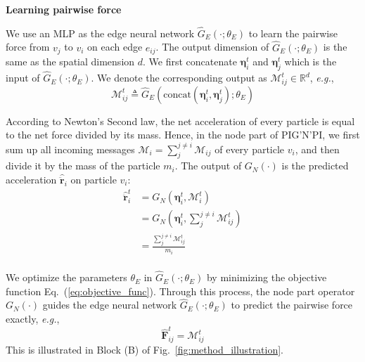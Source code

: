 \documentclass{article}
\newcommand{\pignpi}{PIG'N'PI\xspace}
\begin{document}
\textbf{Learning pairwise force}

We use an MLP as the edge neural network $\hat{G}_E(\cdot; \theta_{E})$ to learn the pairwise force from $v_j$ to $v_i$ on each edge $e_{ij}$. The output dimension of $\hat{G}_E(\cdot; \theta_{E})$ is the same as the spatial dimension $d$.  We first concatenate $\bm{\eta}_i^t$ and $\bm{\eta}_j^t$ which is the input of $\hat{G}_E(\cdot; \theta_{E})$. We denote the corresponding output as $\mathcal{M}_{ij}^t \in \mathbb{R}^{d}$, \textit{e.g.}, 
\begin{equation}
\label{eq:force_edge_operator}
    \mathcal{M}_{ij}^t \triangleq \hat{G}_E(\text{concat}(\bm{\eta}_i^t, \bm{\eta}_j^t); \theta_{E})
\end{equation}

According to Newton's Second law, the net acceleration of every particle is equal to the net force divided by its mass. Hence, in the node part of \pignpi, we first sum up all incoming messages $\mathcal{M}_{i} = \sum_j^{j\neq i}\mathcal{M}_{ij}$ of every particle $v_i$, and then divide it by the mass of the particle $m_i$. The output of $G_N(\cdot)$ is the predicted acceleration $\bm{\hat{\ddot{r}}}_i$ on particle $v_i$:
\begin{equation}
\label{eq:force_node_operator}
	\begin{split}
		\bm{\hat{\ddot{r}}}_i^t & = G_N(\bm{\eta}_i^t, \textstyle \mathcal{M}_{i}^t) \\
		& = G_N(\bm{\eta}_i^t, \textstyle \sum_{j}^{j \neq i} \mathcal{M}_{ij}^t) \\
        & = \frac{\textstyle \sum_{j}^{j \neq i} \mathcal{M}_{ij}^t}{m_i}\\
    \end{split}
\end{equation}


We optimize the parameters $\theta_{E}$ in $\hat{G}_E(\cdot; \theta_{E})$ by minimizing the objective function Eq.~(\ref{eq:objective_func}). Through this process, the node part  operator $G_N(\cdot)$ guides the edge neural network $\hat{G}_E(\cdot; \theta_{E})$ to predict the pairwise force exactly, \textit{e.g.},  
\begin{equation}
    \label{eq:force-prediction-forceCase}
    \bm{\hat{F}}_{ij}^t = \mathcal{M}_{ij}^t
\end{equation}
{This is illustrated in Block (B) of Fig.~\ref{fig:method_illustration}.}
\end{document}
